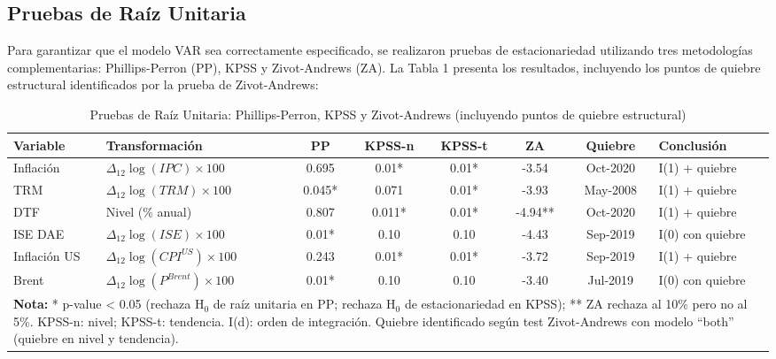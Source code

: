 \documentclass[12pt,a4paper]{article}
\begin{document}
\subsection{Pruebas de Raíz Unitaria}

Para garantizar que el modelo VAR sea correctamente especificado, se realizaron pruebas de estacionariedad utilizando tres metodologías complementarias: Phillips-Perron (PP), KPSS y Zivot-Andrews (ZA). La Tabla 1 presenta los resultados, incluyendo los puntos de quiebre estructural identificados por la prueba de Zivot-Andrews:

\begin{table}[H]
\centering
\footnotesize
\begin{tabular}{p{2.2cm}|p{2.3cm}|ccccc|p{1.8cm}}
\toprule
\textbf{Variable} & \textbf{Transformación} & \textbf{PP} & \textbf{KPSS-n} & \textbf{KPSS-t} & \textbf{ZA} & \textbf{Quiebre} & \textbf{Conclusión} \\
\midrule
Inflación & $\Delta_{12}\log(IPC) \times 100$ & 0.695 & 0.01* & 0.01* & -3.54 & Oct-2020 & I(1) + quiebre \\
\midrule
TRM & $\Delta_{12}\log(TRM) \times 100$ & 0.045* & 0.071 & 0.01* & -3.93 & May-2008 & I(1) + quiebre \\
\midrule
DTF & Nivel (\% anual) & 0.807 & 0.011* & 0.01* & -4.94** & Oct-2020 & I(1) + quiebre \\
\midrule
ISE DAE & $\Delta_{12}\log(ISE) \times 100$ & 0.01* & 0.10 & 0.10 & -4.43 & Sep-2019 & I(0) con quiebre \\
\midrule
Inflación US & $\Delta_{12}\log(CPI^{US}) \times 100$ & 0.243 & 0.01* & 0.01* & -3.72 & Sep-2019 & I(1) + quiebre \\
\midrule
Brent & $\Delta_{12}\log(P^{Brent}) \times 100$ & 0.01* & 0.10 & 0.10 & -3.40 & Jul-2019 & I(0) con quiebre \\
\bottomrule
\multicolumn{8}{p{14cm}}{\scriptsize \textbf{Nota:} * p-value < 0.05 (rechaza H$_0$ de raíz unitaria en PP; rechaza H$_0$ de estacionariedad en KPSS); ** ZA rechaza al 10\% pero no al 5\%. KPSS-n: nivel; KPSS-t: tendencia. I(d): orden de integración. Quiebre identificado según test Zivot-Andrews con modelo ``both'' (quiebre en nivel y tendencia).} \\
\end{tabular}
\caption{Pruebas de Raíz Unitaria: Phillips-Perron, KPSS y Zivot-Andrews (incluyendo puntos de quiebre estructural)}
\label{tab:raices}
\end{table}
\end{document}
